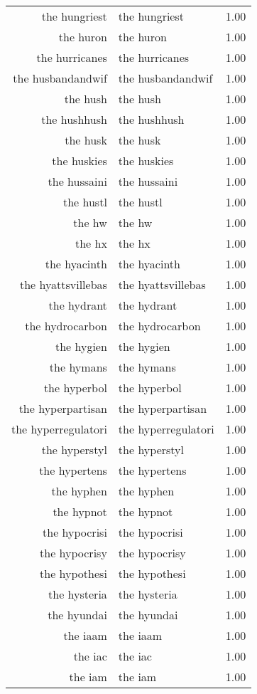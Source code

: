 \begin{table}[ht]
\begin{tabular}{rlr}
  the hungriest & the hungriest & 1.00 \\ 
  the huron & the huron & 1.00 \\ 
  the hurricanes & the hurricanes & 1.00 \\ 
  the husbandandwif & the husbandandwif & 1.00 \\ 
  the hush & the hush & 1.00 \\ 
  the hushhush & the hushhush & 1.00 \\ 
  the husk & the husk & 1.00 \\ 
  the huskies & the huskies & 1.00 \\ 
  the hussaini & the hussaini & 1.00 \\ 
  the hustl & the hustl & 1.00 \\ 
  the hw & the hw & 1.00 \\ 
  the hx & the hx & 1.00 \\ 
  the hyacinth & the hyacinth & 1.00 \\ 
  the hyattsvillebas & the hyattsvillebas & 1.00 \\ 
  the hydrant & the hydrant & 1.00 \\ 
  the hydrocarbon & the hydrocarbon & 1.00 \\ 
  the hygien & the hygien & 1.00 \\ 
  the hymans & the hymans & 1.00 \\ 
  the hyperbol & the hyperbol & 1.00 \\ 
  the hyperpartisan & the hyperpartisan & 1.00 \\ 
  the hyperregulatori & the hyperregulatori & 1.00 \\ 
  the hyperstyl & the hyperstyl & 1.00 \\ 
  the hypertens & the hypertens & 1.00 \\ 
  the hyphen & the hyphen & 1.00 \\ 
  the hypnot & the hypnot & 1.00 \\ 
  the hypocrisi & the hypocrisi & 1.00 \\ 
  the hypocrisy & the hypocrisy & 1.00 \\ 
  the hypothesi & the hypothesi & 1.00 \\ 
  the hysteria & the hysteria & 1.00 \\ 
  the hyundai & the hyundai & 1.00 \\ 
  the iaam & the iaam & 1.00 \\ 
  the iac & the iac & 1.00 \\ 
  the iam & the iam & 1.00 \\ 

\end{tabular}
\end{table}
